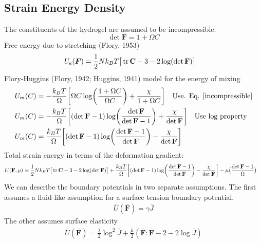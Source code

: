 \documentclass[12pt,3p]{article}
\numberwithin{equation}{section}
\begin{document}
\subsection{Strain Energy Density}
\vspace{-1ex}
The constituents of the hydrogel are assumed to be incompressible: 
\begin{equation}\label{incompressible}
\det \mathbf{F} = 1 + \Omega C 
\end{equation}
Free energy due to stretching (Flory, 1953)
\begin{align}\label{Stretch}
\begin{split}
U_e (\boldsymbol{F}) &=  \frac{1}{2} N k_B T \big[ \tr \mathbf{C} - 3 - 2 \log (\det \mathbf{F}) \big] 
\end{split}
\end{align}
Flory-Huggins (Flory, 1942; Huggins, 1941) model for the energy of mixing 
\begin{align}\label{Mix}
\begin{split}
U_m(C) &= - \frac{k_B T}{\Omega} \bigg[ \Omega C \log(\frac{1 + \Omega C}{\Omega C}) + \frac{\chi}{1 + \Omega C} \bigg] \quad \text{Use. Eq. \ref{incompressible}} \\
U_m(C) &= - \frac{k_B T}{\Omega} \bigg[ (\det \mathbf{F} - 1) \log(\frac{\det \mathbf{F}}{\det \mathbf{F} - 1}) + \frac{\chi}{\det \mathbf{F}} \bigg] \quad \text{Use log property}\\
U_m(C) &= \frac{k_B T}{\Omega} \bigg[ (\det \mathbf{F} - 1) \log (\frac{\det \mathbf{F} - 1}{\det \mathbf{F}}) - \frac{\chi}{\det \mathbf{F}} \bigg] 
\end{split}
\end{align}
Total strain energy in terms of the deformation gradient: 
\begin{align*}
U (\mathbf{F}, \mu) &= \frac{1}{2} N k_B T \big[ \tr \mathbf{C} - 3 - 2 \log (\det \mathbf{F}) \big] + \frac{k_B T}{\Omega} \bigg[ (\det \mathbf{F} - 1) \log (\frac{\det \mathbf{F} - 1}{\det \mathbf{F}}) - \frac{\chi}{\det \mathbf{F}} \bigg] - \mu \big(\frac{\det \mathbf{F} - 1}{\Omega} \big)
\end{align*}
We can describe the boundary potentials in two separate assumptions. The first assumes a fluid-like assumption for a surface tension boundary potential. 
\begin{align}\label{EqSTPotEnergy}
\bar{U} (\mathbf{\bar{F}}) = \gamma \bar{J}
\end{align}
The other assumes surface elasticity
\begin{align}\label{EqNhPotEnergy}
\bar{U} (\mathbf{\bar{F}}) = \frac{\bar{\lambda}}{2} \log^2 \bar{J} + \frac{\bar{\mu}}{2} (\mathbf{\bar{F}} : \mathbf{\bar{F}} - 2 - 2 \log \bar{J})
\end{align}
\end{document}
